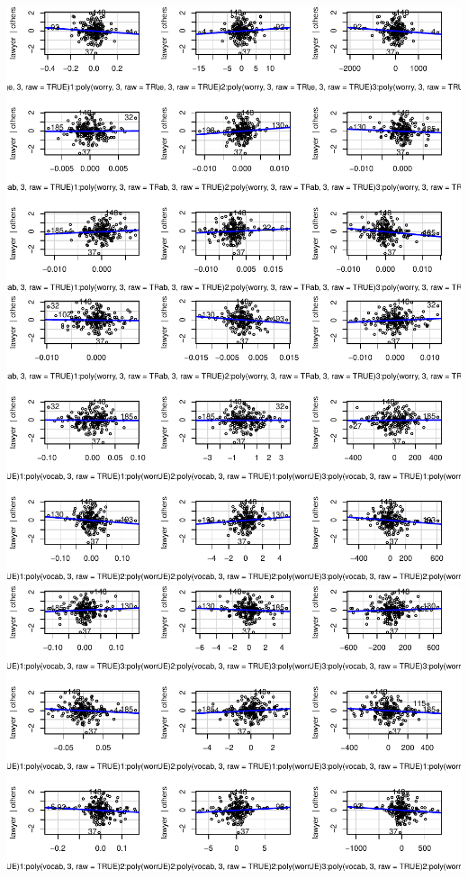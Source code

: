 \documentclass[
]{article}
\begin{document}
\includegraphics{HW5-Trinath-Sai-Subhash-Reddy-Pittala_files/figure-latex/unnamed-chunk-22-5.pdf}
\includegraphics{HW5-Trinath-Sai-Subhash-Reddy-Pittala_files/figure-latex/unnamed-chunk-22-6.pdf}
\includegraphics{HW5-Trinath-Sai-Subhash-Reddy-Pittala_files/figure-latex/unnamed-chunk-22-7.pdf}
\end{document}
